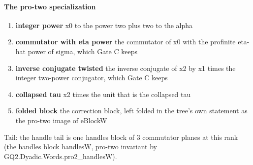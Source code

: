 \paragraph{The pro-two specialization}
\begin{enumerate}
\item[(1)] \textbf{integer power} x0 to the power two plus two to the alpha
\item[(2)] \textbf{commutator with eta power} the commutator of x0 with the profinite eta-hat power of sigma, which Gate C keeps
\item[(3)] \textbf{inverse conjugate twisted} the inverse conjugate of x2 by x1 times the integer two-power conjugator, which Gate C keeps
\item[(4)] \textbf{collapsed tau} x2 times the unit that is the collapsed tau
\item[(5)] \textbf{folded block} the correction block, left folded in the tree's own statement as the pro-two image of eBlockW
\end{enumerate}
Tail: the handle tail is one handles block of 3 commutator planes at this rank (the handles block handlesW, pro-two invariant by GQ2.Dyadic.Words.pro2\_handlesW).
